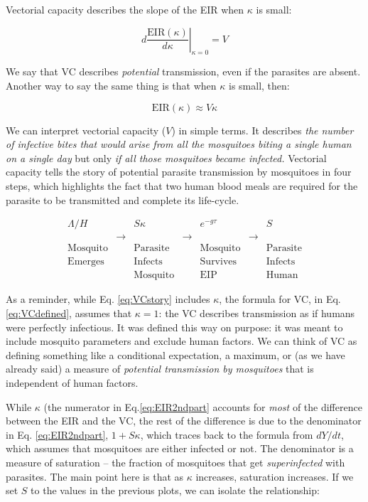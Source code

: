 \documentclass[
]{book}
\begin{document}
Vectorial capacity describes the slope of the EIR when \(\kappa\) is small:

\begin{equation}
\left. d\frac{\mbox{EIR}(\kappa)}{d\kappa}\right|_{\kappa = 0} = V
\label{eq:VCisdEIR}
\end{equation}

We say that VC describes \emph{potential} transmission, even if the parasites are absent. Another way to say the same thing is that when \(\kappa\) is small, then:

\begin{equation}
\mbox{EIR}(\kappa) \approx V \kappa
\end{equation}

We can interpret vectorial capacity (\(V\)) in simple terms. It describes \emph{the number of infective bites that would arise from all the mosquitoes biting a single human on a single day} but only \emph{if all those mosquitoes became infected.} Vectorial capacity tells the story of potential parasite transmission by mosquitoes in four steps, which highlights the fact that two human blood meals are required for the parasite to be transmitted and complete its life-cycle.

\begin{equation}
\begin{array}{|c|c|c|c|c|c|c|}
\Lambda/H &  & S \kappa &  & e^{-g\tau} & & S \\
& \rightarrow &  & \rightarrow &  & \rightarrow &  \\
\mbox{Mosquito} & & \mbox{Parasite} & & \mbox{Mosquito} && \mbox{Parasite} \\
\mbox{Emerges} & & \mbox{Infects} & & \mbox{Survives} && \mbox{Infects} \\
 & & \mbox{Mosquito} & & \mbox{EIP} && \mbox{Human}
\end{array}
\label{eq:VCstory}
\end{equation}

As a reminder, while Eq. \eqref{eq:VCstory} includes \(\kappa\), the formula for VC, in Eq. \eqref{eq:VCdefined}, assumes that \(\kappa=1\): the VC describes transmission as if humans were perfectly infectious. It was defined this way on purpose: it was meant to include mosquito parameters and exclude human factors. We can think of VC as defining something like a conditional expectation, a maximum, or (as we have already said) a measure of \emph{potential transmission by mosquitoes} that is independent of human factors.

While \(\kappa\) (the numerator in Eq.\eqref{eq:EIR2ndpart} accounts for \emph{most} of the difference between the EIR and the VC, the rest of the difference is due to the denominator in Eq. \eqref{eq:EIR2ndpart}, \(1+S\kappa\), which traces back to the formula from \(dY/dt\), which assumes that mosquitoes are either infected or not. The denominator is a measure of saturation -- the fraction of mosquitoes that get \emph{superinfected} with parasites. The main point here is that as \(\kappa\) increases, saturation increases. If we set \(S\) to the values in the previous plots, we can isolate the relationship:
\end{document}
